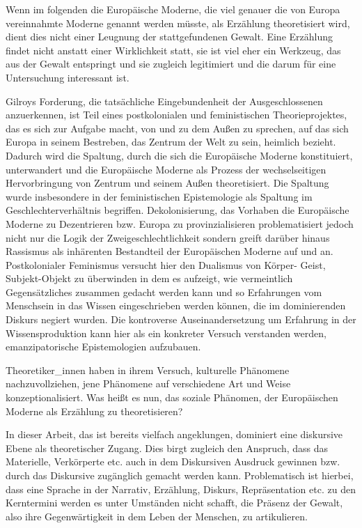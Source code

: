Wenn im folgenden die Europäische Moderne, die viel genauer die von Europa
vereinnahmte Moderne genannt werden müsste, als Erzählung theoretisiert wird,
dient dies nicht einer Leugnung der stattgefundenen Gewalt. Eine Erzählung
findet nicht anstatt einer Wirklichkeit statt, sie ist viel eher ein Werkzeug,
das aus der Gewalt entspringt und sie zugleich legitimiert und die darum für
eine Untersuchung interessant ist.\footnotemark {} 

Gilroys Forderung, die tatsächliche Eingebundenheit der Ausgeschlossenen
anzuerkennen, ist Teil eines postkolonialen und feministischen
Theorieprojektes, das es sich zur Aufgabe macht, von und zu dem Außen zu
sprechen, auf das sich Europa in seinem Bestreben, das Zentrum der Welt zu
sein, heimlich bezieht. Dadurch wird die Spaltung, durch die sich die
Europäische Moderne konstituiert, unterwandert und die Europäische Moderne als
Prozess der wechselseitigen Hervorbringung von Zentrum und seinem Außen
theoretisiert. Die Spaltung wurde insbesondere in der feministischen
Epistemologie als Spaltung im Geschlechterverhältnis begriffen.
Dekolonisierung, das Vorhaben die  Europäische Moderne zu Dezentrieren bzw.
Europa zu \glqq provinzialisieren \grqq\footnotemark
{} problematisiert jedoch nicht nur die Logik der
Zweigeschlechtlichkeit sondern greift darüber hinaus Rassismus als inhärenten
Bestandteil der Europäischen Moderne auf und an. Postkolonialer Feminismus
versucht hier den Dualismus von Körper- Geist, Subjekt-Objekt zu überwinden in
dem es aufzeigt, wie vermeintlich Gegensätzliches zusammen gedacht werden kann
und so Erfahrungen vom Menschsein in das Wissen eingeschrieben werden können,
die im dominierenden Diskurs negiert wurden. Die kontroverse Auseinandersetzung
um Erfahrung in der Wissensproduktion kann hier als ein konkreter Versuch
verstanden werden, emanzipatorische Epistemologien aufzubauen.

Theoretiker\_innen haben in ihrem Versuch, kulturelle Phänomene
nachzuvollziehen, jene Phänomene auf verschiedene Art und Weise
konzeptionalisiert. Was heißt es nun, das soziale Phänomen, der Europäischen
Moderne als Erzählung zu theoretisieren?

In dieser Arbeit, das ist bereits vielfach angeklungen, dominiert eine
diskursive Ebene als theoretischer Zugang. Dies birgt zugleich den Anspruch,
dass das Materielle, Verkörperte etc. auch in dem Diskursiven Ausdruck gewinnen
bzw. durch das Diskursive zugänglich gemacht werden kann. Problematisch ist
hierbei, dass eine Sprache in der Narrativ, Erzählung, Diskurs, Repräsentation
etc. zu den Kerntermini werden es unter Umständen nicht schafft, die Präsenz
der Gewalt, also ihre Gegenwärtigkeit in dem Leben der Menschen, zu
artikulieren.

